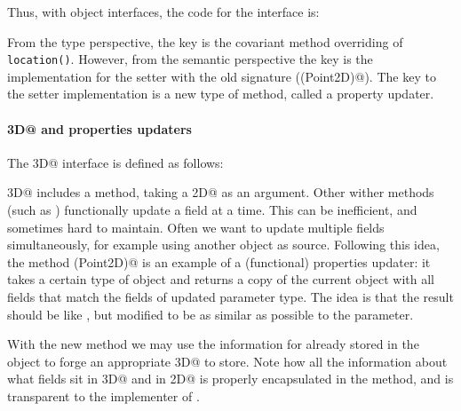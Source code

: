 Thus, with object interfaces, the code for the \Q@Bird@ interface is:




\noindent From the type perspective, the key is the covariant method
overriding of \texttt{location()}. However, from the semantic
perspective the key is the implementation for the setter with the old
signature (\Q@location(Point2D)@). The key to the setter
implementation is a new type of \Q@with@ method, called a property updater.

\paragraph{\Q@Point3D@ and properties updaters}
The \Q@Point3D@ interface is defined as follows:


\noindent \Q@Point3D@ includes a
\Q@with@ method, taking a \Q@Point2D@ as an argument.
Other wither methods (such as \Q@withX@) functionally update a field at a time.  This can be
inefficient, and sometimes hard to maintain.  Often we want to update multiple
fields simultaneously, for example using another object as source.  Following
this idea, the method \Q@with(Point2D)@ is an example of a (functional)
properties updater: it takes a certain type of object and returns a copy of the
current object with all fields that match the fields of updated
parameter type. The idea is that the result should be like \Q@this@, but
modified to be as similar as possible to the parameter.

With the new \Q@with@ method we may use the information for
\Q@z@ already stored in the object to forge an appropriate \Q@Point3D@
to store. Note how all the information about what fields sit in
\Q@Point3D@ and in \Q@Point2D@ is properly encapsulated in the
\Q@with@ method, and is transparent to the implementer of \Q@Bird@.

